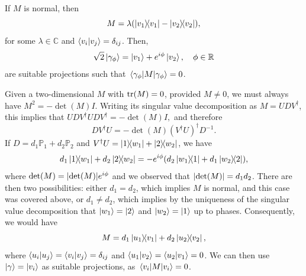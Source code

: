 \documentclass[
	aps, pra,
	superscriptaddress, twocolumn,
	floatfix,
	10pt
]{revtex4-1}
\newcommand{\parTitle}[1]{\noindent{\color{Mahogany}(\emph{#1})}}
\newcommand{\CC}{\mathbb{C}}
\newcommand{\PP}{\mathbb{P}}
\newcommand{\RR}{\mathbb{R}}
\renewcommand{\parTitle}[1]{}
\begin{document}
\parTitle{Proof for $M$ normal}
If $M$ is normal, then
\begin{equation}
	M = \lambda( \ketbra{v_1} - \ketbra{v_2}),
\end{equation}
for some $\lambda\in\CC$ and $\braket{v_i}{v_j}=\delta_{ij}$.
Then,
\begin{equation}
	\sqrt2\ket{\gamma_\phi} = \ket{v_1} + e^{i\phi}\ket{v_2}, \quad \phi\in\RR
\end{equation}
are suitable projections such that $\mel{\gamma_\phi}{M}{\gamma_\phi}=0$.

\parTitle{Proof for general $M$}
Given a two-dimensional $M$ with $\tr(M)=0$, provided $M\neq0$, we must always have $M^2=-\det(M) I$. Writing its singular value decomposition as
$M=UDV^\dagger$, this implies that
$%
	UDV^\dagger UDV^\dagger = -\det(M) I,
$ %
and therefore
\begin{equation}
	DV^\dagger U = -\det(M) (V^\dagger U)^\dagger D^{-1}.
\end{equation}
If $D=d_1\PP_1+d_2\PP_2$ and
$V^\dagger U = \ketbra{1}{w_1} + \ketbra{2}{w_2}$, we have
\begin{equation}
	d_1 \ketbra{1}{w_1} + d_2 \ketbra{2}{w_2} =
	-e^{i\phi}(d_2\ketbra{w_1}{1} + d_1\ketbra{w_2}{2}),
\end{equation}
where $\det(M)=\abs{\det(M)}e^{i\phi}$ and we observed that $\abs{\det(M)}=d_1 d_2$.
There are then two possibilities: either $d_1=d_2$, which implies $M$ is normal, and this case was covered above, or $d_1\neq d_2$, which implies by the uniqueness of the singular value decomposition that $\ket{w_1}=\ket2$ and $\ket{w_2}=\ket1$ up to phases.
Consequently, we would have
\begin{equation}
	M = d_1 \ketbra{u_1}{v_1} + d_2 \ketbra{u_2}{v_2},
\end{equation}
where $\braket{u_i}{u_j}=\braket{v_i}{v_j}=\delta_{ij}$ and $\braket{u_1}{v_2}=\braket{u_2}{v_1}=0$.
We can then use $\ket\gamma=\ket{v_i}$ as suitable projections, as $\mel{v_i}{M}{v_i}=0$.
\end{document}
